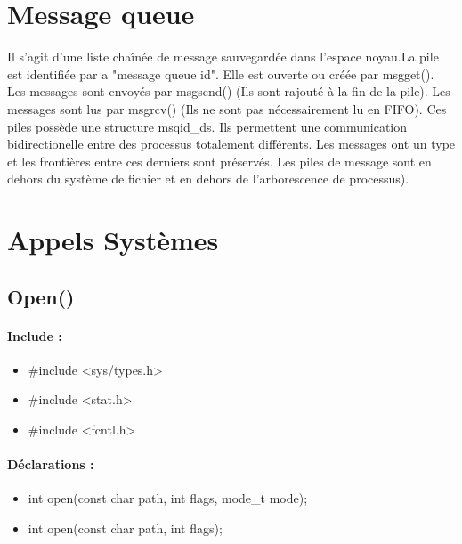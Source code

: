 \documentclass{article}[12pt]
\begin{document}
\section{Message queue}
Il s'agit d'une liste chaînée de message sauvegardée dans l'espace noyau.La pile est identifiée par a "message queue id". Elle est ouverte ou créée par msgget(). Les messages sont envoyés par msgsend() (Ils sont rajouté à la fin de la pile). Les messages sont lus par msgrcv() (Ils ne sont pas nécessairement lu en FIFO).  Ces piles possède une structure  msqid\_ds. Ils permettent une communication bidirectionelle entre des processus totalement différents. Les messages ont un type et les frontières entre ces derniers sont préservés. Les piles de message sont en dehors du système de fichier et en dehors de l'arborescence de processus).  
\section{Appels Systèmes}
\subsection{Open()}
\paragraph{Include : }
\begin{itemize}
	\item \#include <sys/types.h>
	\item \#include <stat.h>
	\item \#include <fcntl.h>
\end{itemize}
\paragraph{Déclarations : }
\begin{itemize}
	\item int open(const char \* path, int flags, mode\_t mode);
	\item int open(const char \* path, int flags);
\end{itemize}
\end{document}
